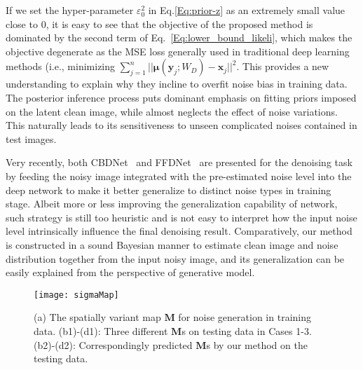 \documentclass{article}
\begin{document}
If we set the hyper-parameter $\varepsilon_0^2$ in Eq.\eqref{Eq:prior-z} as an extremely small value close to $0$, it is
easy to see that the objective of the proposed method is dominated by the second term of Eq.~\eqref{Eq:lower_bound_likeli},
which makes the objective degenerate as the MSE loss generally used in traditional deep learning
methods (i.e., minimizing $\sum_{j=1}^n||\bm{\mu}(\bm{y}_j;W_{D})-\bm{x}_j||^2$. This provides a new understanding to
explain why they incline to overfit noise bias in training data. The posterior inference process puts dominant
emphasis on fitting priors imposed on the latent clean image, while almost neglects the effect of noise variations. This
naturally leads to its sensitiveness to unseen complicated noises contained in test images.

Very recently, both CBDNet~\cite{guo2018toward} and FFDNet~\cite{zhang2018ffdnet} are presented for the
denoising task by feeding the noisy image integrated with the pre-estimated noise level into the deep network to
make it better generalize to distinct noise types in training stage. Albeit more or less improving
the generalization capability of network, such strategy is still too heuristic and is not easy to interpret
how the input noise level intrinsically influence the final denoising result. Comparatively, our method is
constructed in a sound Bayesian manner to estimate clean image and noise distribution together from the input
noisy image, and its generalization can be easily explained from the perspective of generative model.
\begin{figure}[t]
    \centering\vspace{-3mm}
    \texttt{[image: sigmaMap]}\vspace{-3mm}
    \caption{\small{(a) The spatially variant map $\bm{M}$ for noise generation in training data. (b1)-(d1):
        Three different $\bm{M}$s on testing data in Cases 1-3.
        (b2)-(d2): Correspondingly predicted $\bm{M}$s by our method on the testing data.}}
    \vspace{-2mm}
    \label{fig:sigma_train_test}
\end{figure}
\end{document}
